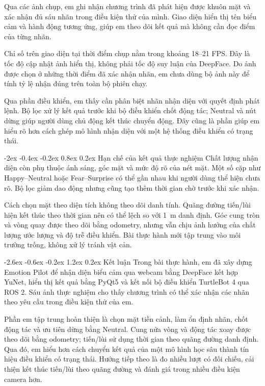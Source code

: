 \documentclass[13pt,a4paper]{extarticle}
\makeatletter
\renewcommand\section{\@startsection{section}{1}{\z@}%
  {-2.6ex \@plus -0.6ex \@minus -0.2ex}%
  {1.2ex \@plus 0.2ex}%
  {\normalfont\fontsize{14}{17}\selectfont\bfseries}}
\renewcommand\subsection{\@startsection{subsection}{2}{\z@}%
  {-2ex \@plus -0.4ex \@minus -0.2ex}%
  {0.8ex \@plus 0.2ex}%
  {\normalfont\normalsize\bfseries}}
\makeatother
\begin{document}
Qua các ảnh chụp, em ghi nhận chương trình đã phát hiện được khuôn mặt và xác nhận đủ sáu nhãn trong điều kiện thử của mình. Giao diện hiển thị tên biểu cảm và hành động tương ứng, giúp em theo dõi kết quả mà không cần đọc điểm của từng nhãn.

Chỉ số trên giao diện tại thời điểm chụp nằm trong khoảng 18--21 FPS. Đây là tốc độ cập nhật ảnh hiển thị, không phải tốc độ suy luận của DeepFace. Do ảnh được chọn ở những thời điểm đã xác nhận nhãn, em chưa dùng bộ ảnh này để tính tỷ lệ nhận đúng trên toàn bộ phiên chạy.

Qua phần điều khiển, em thấy cần phân biệt nhãn nhận diện với quyết định phát lệnh. Bộ lọc xử lý kết quả trước khi bộ điều khiển chốt động tác; Neutral và nút dừng giúp người dùng chủ động kết thúc chuyển động. Đây cũng là phần giúp em hiểu rõ hơn cách ghép mô hình nhận diện với một hệ thống điều khiển có trạng thái.

\subsection{Hạn chế của kết quả thực nghiệm}
Chất lượng nhận diện còn phụ thuộc ánh sáng, góc mặt và mức độ rõ của nét mặt. Một số cặp như Happy--Neutral hoặc Fear--Surprise có thể gần nhau khi người dùng thể hiện chưa rõ. Bộ lọc giảm dao động nhưng cũng tạo thêm thời gian chờ trước khi xác nhận.

Cách chọn mặt theo diện tích không theo dõi danh tính. Quãng đường tiến/lùi hiện kết thúc theo thời gian nên có thể lệch so với 1~m danh định. Góc cung tròn và vòng quay được theo dõi bằng odometry, nhưng vẫn chịu ảnh hưởng của chất lượng ước lượng và độ trễ điều khiển. Bài thực hành mới tập trung vào môi trường trống, không xử lý tránh vật cản.

\section{Kết luận}
Trong bài thực hành, em đã xây dựng Emotion Pilot để nhận diện biểu cảm qua webcam bằng DeepFace kết hợp YuNet, hiển thị kết quả bằng PyQt5 và kết nối bộ điều khiển TurtleBot 4 qua ROS 2. Sáu ảnh thực nghiệm cho thấy chương trình có thể xác nhận các nhãn theo yêu cầu trong điều kiện thử của em.

Phần em tập trung hoàn thiện là chọn mặt tiền cảnh, làm ổn định nhãn, chốt động tác và ưu tiên dừng bằng Neutral. Cung nửa vòng và động tác xoay được theo dõi bằng odometry; tiến/lùi sử dụng thời gian theo quãng đường danh định. Qua đó, em hiểu hơn cách chuyển kết quả của một mô hình học sâu thành tín hiệu điều khiển có trạng thái. Hướng tiếp theo là đo nhiều lượt có đối chiếu, cải thiện kết thúc tiến/lùi theo quãng đường và đánh giá trong nhiều điều kiện camera hơn.
\end{document}
